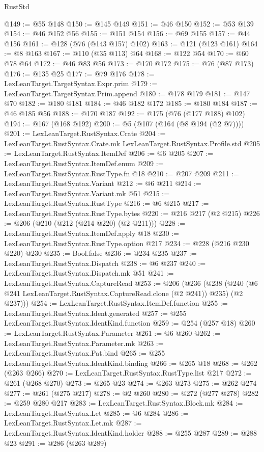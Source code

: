 \begin{lexlean}{RustStd}
\begin{coremodule}
@149 := @55 @148
@150 := @145 @149
@151 := @46 @150
@152 := @53 @139
@154 := @46 @152 @56
@155 := @151 @154
@156 := @69 @155
@157 := @44 @156
@161 := @128 (@76 (@143 @157) @102)
@163 := @121 (@123 @161)
@164 := @8 @163
@167 := @110 (@35 @113) @64
@168 := @122 @54
@170 := @60 @78 @64
@172 := @46 @83 @56
@173 := @170 @172
@175 := @76 (@87 @173)
@176 := @135 @25
@177 := @79 @176
@178 := LexLeanTarget.TargetSyntax.Expr.prim
@179 := LexLeanTarget.TargetSyntax.Prim.append
@180 := @178 @179
@181 := @147 @70
@182 := @180 @181
@184 := @46 @182 @172
@185 := @180 @184
@187 := @46 @185 @56
@188 := @170 @187
@192 := @175 (@76 (@177 @188) @102)
@194 := @167 (@168 @192)
@200 := @5 (@107 (@164 (@8 @194 (@2 @7))))
@201 := LexLeanTarget.RustSyntax.Crate
@204 := LexLeanTarget.RustSyntax.Crate.mk LexLeanTarget.RustSyntax.Profile.std
@205 := LexLeanTarget.RustSyntax.ItemDef
@206 := @6 @205
@207 := LexLeanTarget.RustSyntax.ItemDef.enum
@209 := LexLeanTarget.RustSyntax.RustType.fn @18
@210 := @207 @209
@211 := LexLeanTarget.RustSyntax.Variant
@212 := @6 @211
@214 := LexLeanTarget.RustSyntax.Variant.mk @51
@215 := LexLeanTarget.RustSyntax.RustType
@216 := @6 @215
@217 := LexLeanTarget.RustSyntax.RustType.bytes
@220 := @216 @217 (@2 @215)
@226 := @206 (@210 (@212 (@214 @220) (@2 @211)))
@228 := LexLeanTarget.RustSyntax.ItemDef.apply @18
@230 := LexLeanTarget.RustSyntax.RustType.option @217
@234 := @228 (@216 @230 @220) @230
@235 := Bool.false
@236 := @234 @235
@237 := LexLeanTarget.RustSyntax.Dispatch
@238 := @6 @237
@240 := LexLeanTarget.RustSyntax.Dispatch.mk @51
@241 := LexLeanTarget.RustSyntax.CaptureRead
@253 := @206
    (@236
      (@238 (@240 (@6 @241 LexLeanTarget.RustSyntax.CaptureRead.clone (@2 @241)) @235) (@2 @237)))
@254 := LexLeanTarget.RustSyntax.ItemDef.function
@255 := LexLeanTarget.RustSyntax.Ident.generated
@257 := @255 LexLeanTarget.RustSyntax.IdentKind.function
@259 := @254 (@257 @18)
@260 := LexLeanTarget.RustSyntax.Parameter
@261 := @6 @260
@262 := LexLeanTarget.RustSyntax.Parameter.mk
@263 := LexLeanTarget.RustSyntax.Pat.bind
@265 := @255 LexLeanTarget.RustSyntax.IdentKind.binding
@266 := @265 @18
@268 := @262 (@263 @266)
@270 := LexLeanTarget.RustSyntax.RustType.list @217
@272 := @261 (@268 @270)
@273 := @265 @23
@274 := @263 @273
@275 := @262 @274
@277 := @261 (@275 @217)
@278 := @2 @260
@280 := @272 (@277 @278)
@282 := @259 @280 @217
@283 := LexLeanTarget.RustSyntax.Block.mk
@284 := LexLeanTarget.RustSyntax.Let
@285 := @6 @284
@286 := LexLeanTarget.RustSyntax.Let.mk
@287 := LexLeanTarget.RustSyntax.IdentKind.holder
@288 := @255 @287
@289 := @288 @23
@291 := @286 (@263 @289)

\end{coremodule}
\end{lexlean}
